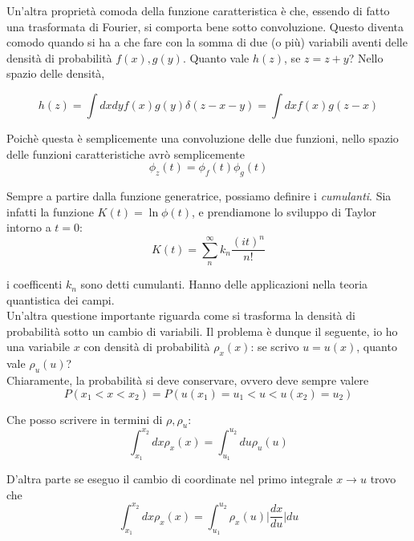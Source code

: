 \documentclass{report}
\begin{document}
Un'altra proprietà comoda della funzione caratteristica è che, essendo di fatto una trasformata di Fourier, si comporta bene sotto convoluzione. Questo diventa comodo quando si ha a che fare con la somma di due (o più) variabili aventi delle densità di probabilità $f(x), g(y)$. Quanto vale $h(z)$, se $z = z+y$? Nello spazio delle densità, 

\begin{equation}
    h(z) = \int dxdyf(x)g(y)\delta(z-x-y) = \int dxf(x)g(z-x) 
\end{equation}

Poichè questa è semplicemente una convoluzione delle due funzioni, nello spazio delle funzioni caratteristiche avrò semplicemente 
\begin{equation}
    \phi_z(t) = \phi_f(t)\phi_g(t)
\end{equation}

Sempre a partire dalla funzione generatrice, possiamo definire i \emph{cumulanti}. Sia infatti la funzione $K(t) = \ln{\phi(t)}$, e prendiamone lo sviluppo di Taylor intorno a $t=0$: 
\begin{equation}
    K(t) = \sum_n^\infty k_n\frac{(it)^n}{n!}
\end{equation}

i coefficenti $k_n$ sono detti cumulanti. Hanno delle applicazioni nella teoria quantistica dei campi. \\

Un'altra questione importante riguarda come si trasforma la densità di probabilità sotto un cambio di variabili. Il problema è dunque il seguente, io ho una variabile $x$ con densità di probabilità $\rho_x(x)$: se scrivo $u=u(x)$, quanto vale $\rho_u(u)$? \\

Chiaramente, la probabilità si deve conservare, ovvero deve sempre valere 
\begin{equation}
    P(x_1 < x < x_2 ) = P(u(x_1)= u_1< u < u(x_2)= u_2)
\end{equation}

Che posso scrivere in termini di $\rho, \rho_u$: 
\begin{equation}
    \int_{x_1}^{x_2}dx\rho_x(x) = \int_{u_1}^{u_2}du\rho_u(u)
\end{equation}

D'altra parte se eseguo il cambio di coordinate nel primo integrale $x \rightarrow u$ trovo che 
\begin{equation}
    \int_{x_1}^{x_2}dx\rho_x(x) =  \int_{u_1}^{u_2}\rho_x(u)\biggr| \frac{dx}{du}\biggr| du
\end{equation}
\end{document}
